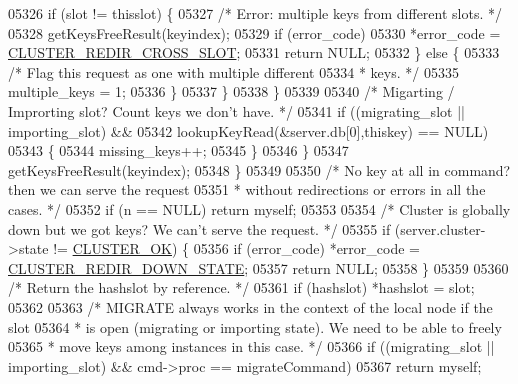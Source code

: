 \begin{DoxyCode}
{{{{{{{{{{{{{{{{{{{{{{{{{{{{{{{{{{{{{{{{{{{{{{{{{{{{{{{{{{{{{{{{{{{{{{{{{{{{{{{{{{{{{{{{{{{{{{{{{{{{{{{{{{{{{05326                     \textcolor{keywordflow}{if} (slot != thisslot) \{
05327                         \textcolor{comment}{/* Error: multiple keys from different slots. */}
05328                         getKeysFreeResult(keyindex);
05329                         \textcolor{keywordflow}{if} (error\_code)
05330                             *error\_code = \hyperlink{cluster_8h_afbca3b8aad0bd8d1f013d81af78672af}{CLUSTER\_REDIR\_CROSS\_SLOT};
05331                         \textcolor{keywordflow}{return} NULL;
05332                     \} \textcolor{keywordflow}{else} \{
05333                         \textcolor{comment}{/* Flag this request as one with multiple different}
05334 \textcolor{comment}{                         * keys. */}
05335                         multiple\_keys = 1;
05336                     \}
05337                 \}
05338             \}
05339 
05340             \textcolor{comment}{/* Migarting / Improrting slot? Count keys we don't have. */}
05341             \textcolor{keywordflow}{if} ((migrating\_slot || importing\_slot) &&
05342                 lookupKeyRead(&server.db[0],thiskey) == NULL)
05343             \{
05344                 missing\_keys++;
05345             \}
05346         \}
05347         getKeysFreeResult(keyindex);
05348     \}
05349 
05350     \textcolor{comment}{/* No key at all in command? then we can serve the request}
05351 \textcolor{comment}{     * without redirections or errors in all the cases. */}
05352     \textcolor{keywordflow}{if} (n == NULL) \textcolor{keywordflow}{return} myself;
05353 
05354     \textcolor{comment}{/* Cluster is globally down but we got keys? We can't serve the request. */}
05355     \textcolor{keywordflow}{if} (server.cluster->state != \hyperlink{cluster_8h_adbda03922c45cac3cfc98a5c34a9d2d2}{CLUSTER\_OK}) \{
05356         \textcolor{keywordflow}{if} (error\_code) *error\_code = \hyperlink{cluster_8h_a62aea13c6a6bad14d00664033b3cae1a}{CLUSTER\_REDIR\_DOWN\_STATE};
05357         \textcolor{keywordflow}{return} NULL;
05358     \}
05359 
05360     \textcolor{comment}{/* Return the hashslot by reference. */}
05361     \textcolor{keywordflow}{if} (hashslot) *hashslot = slot;
05362 
05363     \textcolor{comment}{/* MIGRATE always works in the context of the local node if the slot}
05364 \textcolor{comment}{     * is open (migrating or importing state). We need to be able to freely}
05365 \textcolor{comment}{     * move keys among instances in this case. */}
05366     \textcolor{keywordflow}{if} ((migrating\_slot || importing\_slot) && cmd->proc == migrateCommand)
05367         \textcolor{keywordflow}{return} myself;
}}}}}}}}}}}}}}}}}}}}}}}}}}}}}}}}}}}}}}}}}}}}}}}}}}}}}}}}}}}}}}}}}}}}}}}}}}}}}}}}}}}}}}}}}}}}}}}}}}}}}}}}}}}}}
\end{DoxyCode}
